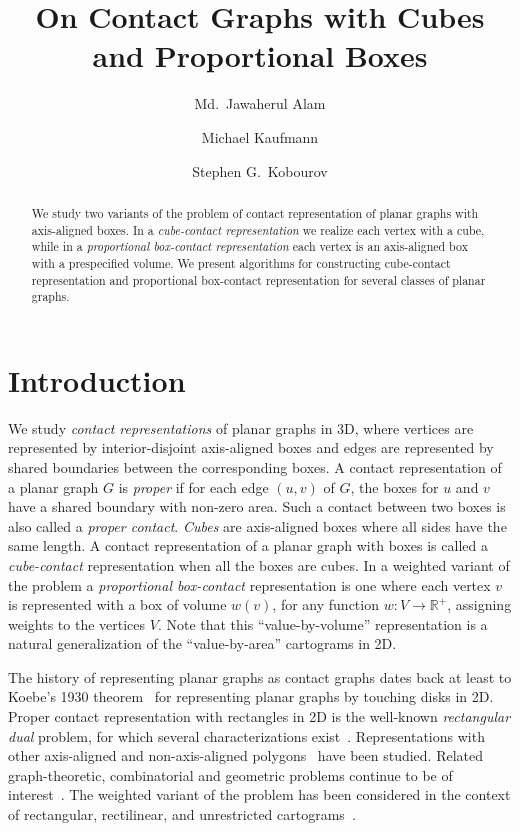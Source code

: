 \documentclass{llncs}
\title{On Contact Graphs with Cubes and Proportional Boxes}
\author
{
	Md.~Jawaherul Alam\inst{1} \and
	Michael Kaufmann\inst{2} \and
	Stephen G.~Kobourov\inst{1}
}
\institute{
	Department of Computer Science, University of Arizona, USA
\and
	Wilhelm-Schickhard-Institut f\"ur Informatik, Universit\"at T\"ubingen, Germany
}
\begin{document}
\date{}
\maketitle



\begin{abstract}
We study two variants of the problem of contact representation of planar graphs with
 axis-aligned boxes. In a \textit{cube-contact representation} we realize each
 vertex with a cube, while in a \textit{proportional box-contact representation} each
 vertex is an axis-aligned box with a prespecified volume. We present
 algorithms for constructing cube-contact representation and proportional box-contact
 representation for several classes of planar graphs.

\end{abstract}








\section{Introduction}

We study \textit{contact representations} of planar graphs in 3D, where vertices are
 represented by interior-disjoint axis-aligned boxes and edges are represented by shared
 boundaries between the corresponding boxes. A contact representation of a planar graph
 $G$ is \textit{proper} if for each edge $(u,v)$ of $G$, the boxes for $u$ and $v$ have a
 shared boundary with non-zero area. Such a contact between two boxes is also called a
 \textit{proper contact}. \textit{Cubes} are axis-aligned boxes where all sides have the same
 length. A contact representation of a planar graph with boxes is called a \textit{cube-contact}
 representation when all the boxes are cubes. In a weighted variant of
 the problem a \textit{proportional
 box-contact} representation is one where each vertex $v$ is represented with
 a box of volume $w(v)$, for any function
 $w:V\rightarrow\mathbb{R}^+$, assigning weights to the vertices $V$.
 Note that this ``value-by-volume'' representation is a natural
 generalization of the ``value-by-area'' cartograms in 2D.





\smallskip{} The history of representing planar graphs as contact graphs dates back at least to
 Koebe's 1930 theorem~\cite{Koebe36} for representing planar graphs by touching disks
 in 2D. Proper contact representation with rectangles in 2D is the well-known {\em rectangular
 dual} problem, for which several characterizations exist~\cite{KK85,Ungar53}.
 Representations with other axis-aligned and non-axis-aligned
 polygons~\cite{FM94,GHKK10,YS93} have been studied. Related graph-theoretic, combinatorial
 and geometric problems continue to be of
 interest~\cite{BGPV08,Fusy09,EMSV12}. The weighted variant
 of the problem has been considered in the context of 
 rectangular, rectilinear, and unrestricted cartograms~\cite{BR11,EFK+13,KS07}.
\end{document}
